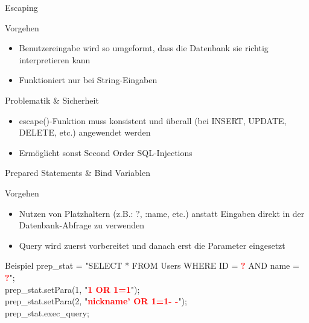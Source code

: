 \begin{frame}{Escaping}
\begin{block}{Vorgehen}
\begin{itemize}
\item Benutzereingabe wird so umgeformt, dass die Datenbank sie richtig interpretieren kann
\item Funktioniert nur bei String-Eingaben
\end{itemize}
\end{block}
\begin{block}{Problematik \& Sicherheit}
\begin{itemize}
\item escape()-Funktion muss konsistent und überall (bei INSERT, UPDATE, DELETE, etc.) angewendet werden
\item Ermöglicht sonst Second Order SQL-Injections
\end{itemize}
\end{block}
\end{frame}

\begin{frame}{Prepared Statements \& Bind Variablen}
\begin{block}{Vorgehen}
\begin{itemize}
\item Nutzen von Platzhaltern (z.B.: ?, :name, etc.) anstatt Eingaben direkt in der Datenbank-Abfrage zu verwenden
\item Query wird zuerst vorbereitet und danach erst die Parameter eingesetzt
\end{itemize}
\end{block}
\begin{block}{Beispiel}
prep\_stat = "{}SELECT * FROM Users WHERE ID = \textcolor{red}{\textbf{?}} AND name = \textcolor{red}{\textbf{?}}"{}; \\
prep\_stat.setPara(1, "{}\textcolor{red}{\textbf{1 OR 1=1}}{}"); \\
prep\_stat.setPara(2, "{}\textcolor{red}{\textbf{nickname'{} OR 1=1- -}}{}"); \\
prep\_stat.exec\_query;
\end{block}
\end{frame}

